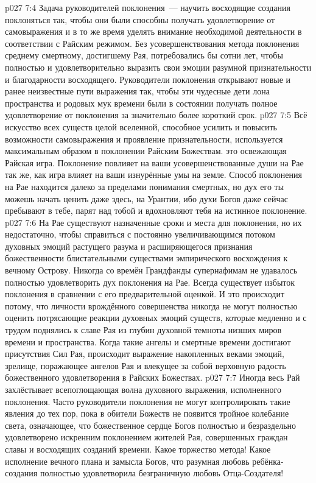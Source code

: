 \vs p027 7:4 \pc Задача руководителей поклонения~--- научить восходящие создания поклоняться так, чтобы они были способны получать удовлетворение от самовыражения и в то же время уделять внимание необходимой деятельности в соответствии с Райским режимом. Без усовершенствования метода поклонения среднему смертному, достигшему Рая, потребовались бы сотни лет, чтобы полностью и удовлетворительно выразить свои эмоции разумной признательности и благодарности восходящего. Руководители поклонения открывают новые и ранее неизвестные пути выражения так, чтобы эти чудесные дети лона пространства и родовых мук времени были в состоянии получать полное удовлетворение от поклонения за значительно более короткий срок.
\vs p027 7:5 Всё искусство всех существ целой вселенной, способное усилить и повысить возможности самовыражения и проявление признательности, используется максимальным образом в поклонении Райским Божествам.  это освежающая Райская игра. Поклонение повлияет на ваши усовершенствованные души на Рае так же, как игра влияет на ваши изнурённые умы на земле. Способ поклонения на Рае находится далеко за пределами понимания смертных, но дух его ты можешь начать ценить даже здесь, на Урантии, ибо духи Богов даже сейчас пребывают в тебе, парят над тобой и вдохновляют тебя на истинное поклонение.
\vs p027 7:6 На Рае существуют назначенные сроки и места для поклонения, но их недостаточно, чтобы справиться с постоянно увеличивающимся потоком духовных эмоций растущего разума и расширяющегося признания божественности блистательными существами эмпирического восхождения к вечному Острову. Никогда со времён Грандфанды супернафимам не удавалось полностью удовлетворить дух поклонения на Рае. Всегда существует избыток поклонения в сравнении с его предварительной оценкой. И это происходит потому, что личности врождённого совершенства никогда не могут полностью оценить потрясающие реакции духовных эмоций существ, которые медленно и с трудом поднялись к славе Рая из глубин духовной темноты низших миров времени и пространства. Когда такие ангелы и смертные времени достигают присутствия Сил Рая, происходит выражение накопленных веками эмоций, зрелище, поражающее ангелов Рая и влекущее за собой верховную радость божественного удовлетворения в Райских Божествах.
\vs p027 7:7 Иногда весь Рай захлёстывает всепоглощающая волна духовного выражения, исполненного поклонения. Часто руководители поклонения не могут контролировать такие явления до тех пор, пока в обители Божеств не появится тройное колебание света, означающее, что божественное сердце Богов полностью и безраздельно удовлетворено искренним поклонением жителей Рая, совершенных граждан славы и восходящих созданий времени. Какое торжество метода! Какое исполнение вечного плана и замысла Богов, что разумная любовь ребёнка\hyp{}создания полностью удовлетворила безграничную любовь Отца\hyp{}Создателя!

